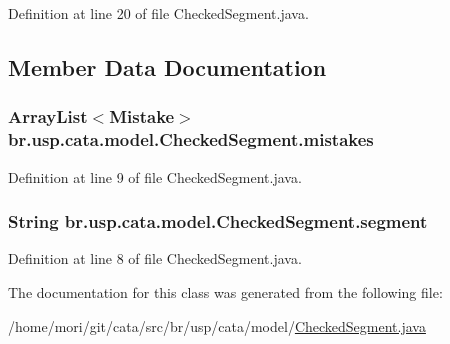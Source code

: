 Definition at line 20 of file Checked\+Segment.\+java.



\subsection{Member Data Documentation}
\hypertarget{classbr_1_1usp_1_1cata_1_1model_1_1_checked_segment_a6b25977a722df2005bfa50f328e0e2db}{
\subsubsection[{mistakes}]{\setlength{\rightskip}{0pt plus 5cm}Array\+List$<${\bf Mistake}$>$ br.\+usp.\+cata.\+model.\+Checked\+Segment.\+mistakes\hspace{0.3cm}{\ttfamily [private]}}}\label{classbr_1_1usp_1_1cata_1_1model_1_1_checked_segment_a6b25977a722df2005bfa50f328e0e2db}


Definition at line 9 of file Checked\+Segment.\+java.

\hypertarget{classbr_1_1usp_1_1cata_1_1model_1_1_checked_segment_ad8012b562129876b671d84e964a86654}{
\subsubsection[{segment}]{\setlength{\rightskip}{0pt plus 5cm}String br.\+usp.\+cata.\+model.\+Checked\+Segment.\+segment\hspace{0.3cm}{\ttfamily [private]}}}\label{classbr_1_1usp_1_1cata_1_1model_1_1_checked_segment_ad8012b562129876b671d84e964a86654}


Definition at line 8 of file Checked\+Segment.\+java.



The documentation for this class was generated from the following file\+:\begin{DoxyCompactItemize}
\item 
/home/mori/git/cata/src/br/usp/cata/model/\hyperlink{_checked_segment_8java}{Checked\+Segment.\+java}\end{DoxyCompactItemize}
